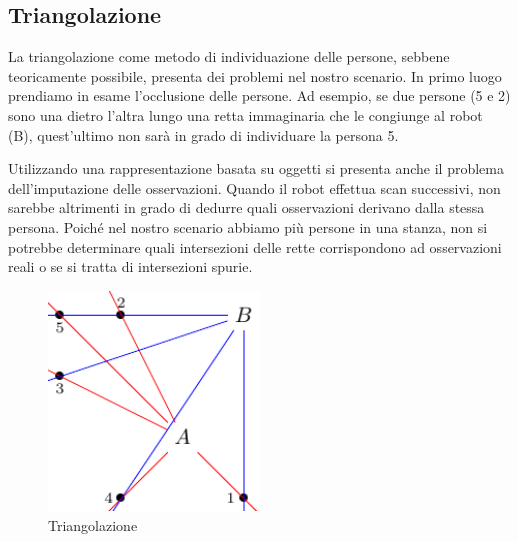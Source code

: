 \documentclass[a4paper]{article}
\begin{document}
	
	\subsection{Triangolazione}\label{subsec:Triangolazione}
	La triangolazione come metodo di individuazione delle persone, sebbene
	teoricamente possibile, presenta dei problemi nel nostro scenario. In primo
	luogo prendiamo in esame l'occlusione delle persone. Ad esempio, se due
	persone (5 e 2) sono una dietro l'altra lungo una retta immaginaria che le
	congiunge al robot (B), quest'ultimo non sarà in grado di individuare la
	persona 5. 
	
	Utilizzando una rappresentazione basata su oggetti si presenta anche il
	problema dell'imputazione delle osservazioni. Quando il robot effettua scan
	successivi, non sarebbe altrimenti in grado di dedurre quali osservazioni
	derivano dalla stessa persona.  Poiché nel nostro scenario abbiamo più
	persone in una stanza, non si potrebbe determinare quali intersezioni delle
	rette corrispondono ad osservazioni reali o se si tratta di intersezioni
	spurie. 
	
	\begin{figure}[H]
		\centering
		\includegraphics[width=0.5\textwidth]{./img/ideal_object_triangulation.pdf}
		\caption{Triangolazione}
		\label{fig:triangulation}
	\end{figure}
	
\end{document}
